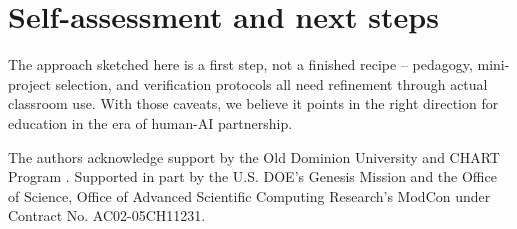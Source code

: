 \documentclass[%
               refpage,       %
               biblatex,     %
               hyphens,      %
               ]{jacow}
\begin{document}
\section{Self-assessment and next steps}

The approach sketched here is a first step, not a finished recipe -- pedagogy, mini-project selection, and verification protocols all need refinement through actual classroom use. With those caveats, we believe it points in the right direction for education in the era of human-AI partnership.

The authors acknowledge support by the Old Dominion University and CHART Program \cite{CHART}. 
Supported in part by the U.S. DOE’s Genesis Mission and the Office of Science, Office of Advanced Scientific Computing Research's ModCon under Contract No. AC02-05CH11231.
\vspace*{-1mm}

 




\printbibliography
\end{document}
